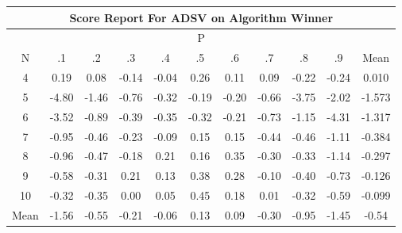 \documentclass[11pt,a4paper]{report}
\begin{document}
\begin{longtable}{ | c || c | c | c | c | c | c | c | c | c || c |}
\hline
\multicolumn{11}{|c|}{ Score Report For ADSV on Algorithm Winner} \\
\hline
\multicolumn{11}{|c|}{ P } \\
\hline
N & .1 & .2 & .3 & .4 & .5 & .6 & .7 & .8 & .9 & Mean\\
 \hline
 \hline
 \endhead
  4 &  \cellcolor[HTML]{F7F7FF} 0.19 &  \cellcolor[HTML]{FFFFFF} 0.08 &  \cellcolor[HTML]{FFFFFF} -0.14 &  \cellcolor[HTML]{FFFFFF} -0.04 &  \cellcolor[HTML]{F7F7FF} 0.26 &  \cellcolor[HTML]{FFFFFF} 0.11 &  \cellcolor[HTML]{FFFFFF} 0.09 &  \cellcolor[HTML]{FFF7F7} -0.22 &  \cellcolor[HTML]{FFF7F7} -0.24 & 0.010 \\
  5 &  \cellcolor[HTML]{FF8787} -4.80 &  \cellcolor[HTML]{FFD7D7} -1.46 &  \cellcolor[HTML]{FFEFEF} -0.76 &  \cellcolor[HTML]{FFF7F7} -0.32 &  \cellcolor[HTML]{FFF7F7} -0.19 &  \cellcolor[HTML]{FFF7F7} -0.20 &  \cellcolor[HTML]{FFEFEF} -0.66 &  \cellcolor[HTML]{FF9F9F} -3.75 &  \cellcolor[HTML]{FFCFCF} -2.02 & -1.573 \\
  6 &  \cellcolor[HTML]{FFA7A7} -3.52 &  \cellcolor[HTML]{FFE7E7} -0.89 &  \cellcolor[HTML]{FFF7F7} -0.39 &  \cellcolor[HTML]{FFF7F7} -0.35 &  \cellcolor[HTML]{FFF7F7} -0.32 &  \cellcolor[HTML]{FFF7F7} -0.21 &  \cellcolor[HTML]{FFEFEF} -0.73 &  \cellcolor[HTML]{FFDFDF} -1.15 &  \cellcolor[HTML]{FF8F8F} -4.31 & -1.317 \\
  7 &  \cellcolor[HTML]{FFE7E7} -0.95 &  \cellcolor[HTML]{FFF7F7} -0.46 &  \cellcolor[HTML]{FFF7F7} -0.23 &  \cellcolor[HTML]{FFFFFF} -0.09 &  \cellcolor[HTML]{FFFFFF} 0.15 &  \cellcolor[HTML]{FFFFFF} 0.15 &  \cellcolor[HTML]{FFF7F7} -0.44 &  \cellcolor[HTML]{FFF7F7} -0.46 &  \cellcolor[HTML]{FFE7E7} -1.11 & -0.384 \\
  8 &  \cellcolor[HTML]{FFE7E7} -0.96 &  \cellcolor[HTML]{FFF7F7} -0.47 &  \cellcolor[HTML]{FFF7F7} -0.18 &  \cellcolor[HTML]{F7F7FF} 0.21 &  \cellcolor[HTML]{FFFFFF} 0.16 &  \cellcolor[HTML]{F7F7FF} 0.35 &  \cellcolor[HTML]{FFF7F7} -0.30 &  \cellcolor[HTML]{FFF7F7} -0.33 &  \cellcolor[HTML]{FFDFDF} -1.14 & -0.297 \\
  9 &  \cellcolor[HTML]{FFEFEF} -0.58 &  \cellcolor[HTML]{FFF7F7} -0.31 &  \cellcolor[HTML]{F7F7FF} 0.21 &  \cellcolor[HTML]{FFFFFF} 0.13 &  \cellcolor[HTML]{F7F7FF} 0.38 &  \cellcolor[HTML]{F7F7FF} 0.28 &  \cellcolor[HTML]{FFFFFF} -0.10 &  \cellcolor[HTML]{FFF7F7} -0.40 &  \cellcolor[HTML]{FFEFEF} -0.73 & -0.126 \\
  10 &  \cellcolor[HTML]{FFF7F7} -0.32 &  \cellcolor[HTML]{FFF7F7} -0.35 &  \cellcolor[HTML]{FFFFFF} 0.00 &  \cellcolor[HTML]{FFFFFF} 0.05 &  \cellcolor[HTML]{F7F7FF} 0.45 &  \cellcolor[HTML]{F7F7FF} 0.18 &  \cellcolor[HTML]{FFFFFF} 0.01 &  \cellcolor[HTML]{FFF7F7} -0.32 &  \cellcolor[HTML]{FFEFEF} -0.59 & -0.099 \\
 \hline
 \hline
Mean &  \cellcolor[HTML]{FFD7D7} -1.56 &  \cellcolor[HTML]{FFEFEF} -0.55 &  \cellcolor[HTML]{FFF7F7} -0.21 &  \cellcolor[HTML]{FFFFFF} -0.06 &  \cellcolor[HTML]{FFFFFF} 0.13 &  \cellcolor[HTML]{FFFFFF} 0.09 &  \cellcolor[HTML]{FFF7F7} -0.30 &  \cellcolor[HTML]{FFE7E7} -0.95 &  \cellcolor[HTML]{FFD7D7} -1.45 &  \cellcolor[HTML]{FFEFEF} -0.54
\end{longtable}
\end{document}
